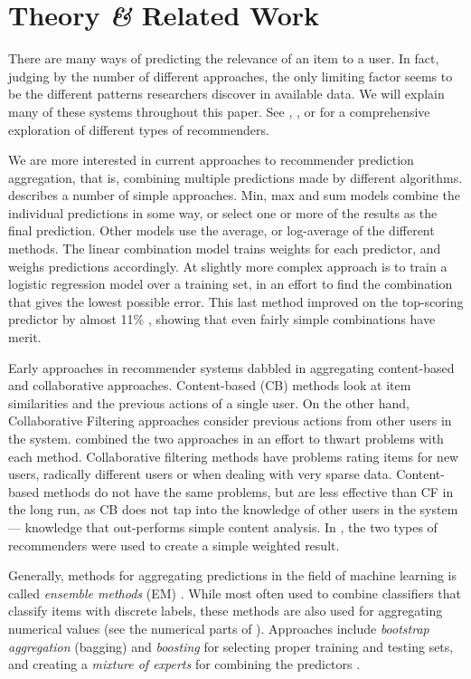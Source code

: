 \section{Theory \emph{\&} Related Work}

There are many ways of predicting the
relevance of an item to a user. 
In fact, judging by the number of different approaches,
the only limiting factor seems to be the different 
patterns researchers discover in available data.
We will explain many of these systems throughout this paper.
See 
\cite{Adomavicius2005}, \cite{Pazzani2007}, \cite{Schafer2007} 
or \cite{Bjorkoy2010d} for a comprehensive exploration 
of different types of recommenders.

We are more interested in current approaches to recommender prediction aggregation,
that is, combining multiple predictions made by different algorithms.
\cite{Aslam2001} describes a number of simple approaches.
Min, max and sum models combine the individual predictions in some way, 
or select one or more of the results as the final prediction. 
Other models use the average, or log-average of the different methods.
The linear combination model trains weights for each predictor, and weighs predictions accordingly.
At slightly more complex approach is to train a logistic regression model \cite[p3]{Aslam2001}
over a training set, in an effort to find the combination that gives the lowest possible error.
This last method improved on the top-scoring predictor by almost 11\% \cite[p3]{Aslam2001},
showing that even fairly simple combinations have merit.

Early approaches in recommender systems dabbled in aggregating content-based and collaborative approaches.
Content-based (CB) methods look at item similarities and the previous actions of a single user.
On the other hand, Collaborative Filtering approaches consider
previous actions from other users in the system.
\cite{Claypool1999} combined the two approaches in an effort to thwart problems with each method.
Collaborative filtering methods have problems rating items for new users, radically different users or when dealing with very sparse data.
Content-based methods do not have the same problems, but are less effective than CF in the long run, as CB does not tap into the 
knowledge of other users in the system --- knowledge that out-performs simple content analysis.
In \cite{Claypool1999}, the two types of recommenders were used to create a simple weighted result.

Generally, methods for aggregating predictions in the field of machine learning is called \emph{ensemble methods} (EM) \cite[p1]{Dietterich2000}.
While most often used to combine classifiers that classify items with discrete labels,
these methods are also used for aggregating numerical values (see the numerical parts of \cite{Breiman1996}).
Approaches include \emph{bootstrap aggregation} (bagging) and \emph{boosting} 
for selecting proper training and testing sets,
and creating a \emph{mixture of experts} for combining the predictors
\cite[p27]{Polikar2006}.

